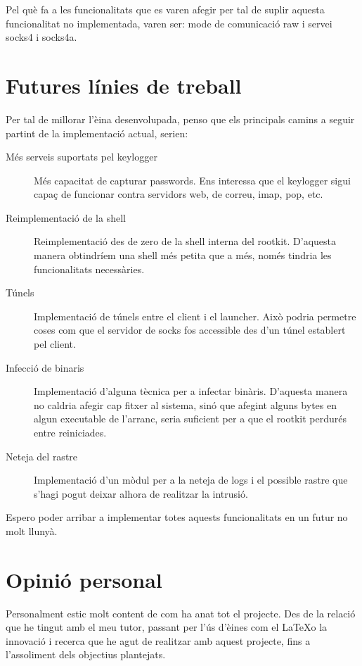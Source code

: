 Pel què fa a les funcionalitats que es varen afegir per tal de suplir aquesta funcionalitat no implementada,
varen ser: mode de comunicació raw i servei socks4 i socks4a. \\

\section{Futures línies de treball}

Per tal de millorar l'èina desenvolupada, penso que els principals camins a seguir partint de la 
implementació actual, serien:

\begin{description}
	\item[Més serveis suportats pel keylogger] Més capacitat de capturar passwords. Ens interessa que el keylogger sigui capaç
		de funcionar contra servidors web, de correu, imap, pop, etc.
	\item[Reimplementació de la shell] Reimplementació des de zero de la shell interna del rootkit. D'aquesta manera obtindríem
		una shell més petita que a més, només tindria les funcionalitats necessàries.  
	\item[Túnels] Implementació de túnels entre el client i el launcher. Això podria permetre coses com que el 
		servidor de socks fos accessible des d'un túnel establert pel client.
	\item[Infecció de binaris] Implementació d'alguna tècnica per a infectar binàris. D'aquesta manera no caldria afegir cap 
		fitxer al sistema, sinó que afegint alguns bytes en algun executable de l'arranc, seria suficient
		per a que el rootkit perdurés entre reiniciades.
	\item[Neteja del rastre] Implementació d'un mòdul per a la neteja de logs i el possible rastre que s'hagi pogut deixar
		alhora de realitzar la intrusió.
\end{description}

Espero poder arribar a implementar totes aquests funcionalitats en un futur no molt llunyà.

\section{Opinió personal}

Personalment estic molt content de com ha anat tot el projecte. Des de la relació que he tingut amb el
meu tutor, passant per l'ús d'èines com el \LaTeX  o la innovació i recerca que he agut de realitzar amb aquest 
projecte, fins a l'assoliment dels objectius plantejats. \\

